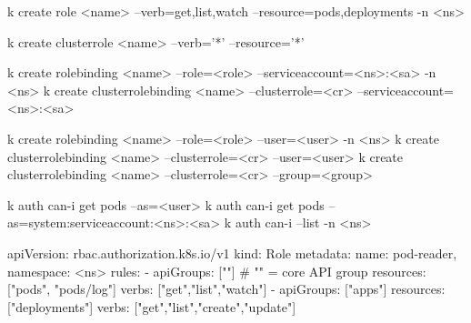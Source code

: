 \begin{tcbitemize}[
  raster columns=2, raster equal height=rows,
  blanker, cheat subtitle
]

  \tcbitem
    \begin{tcbitemize}[
      raster columns=1, raster equal height=rows,
      blanker, cheat subtitle
    ]

      \tcbitem

        \begin{cheatcodebash}
        k create role <name> --verb=get,list,watch --resource=pods,deployments -n <ns>
        \end{cheatcodebash}

        \begin{cheatcodebash}
        k create clusterrole <name> --verb='*' --resource='*'
        \end{cheatcodebash}

        \begin{cheatcodebash}
        k create rolebinding <name> --role=<role> --serviceaccount=<ns>:<sa> -n <ns>
        k create clusterrolebinding <name> --clusterrole=<cr> --serviceaccount=<ns>:<sa>
        \end{cheatcodebash}

        \begin{cheatcodebash}
        k create rolebinding <name> --role=<role> --user=<user> -n <ns>
        k create clusterrolebinding <name> --clusterrole=<cr> --user=<user>
        k create clusterrolebinding <name> --clusterrole=<cr> --group=<group>
        \end{cheatcodebash}

        \begin{cheatcodebash}
        k auth can-i get pods --as=<user>
        k auth can-i get pods --as=system:serviceaccount:<ns>:<sa>
        k auth can-i --list -n <ns>
        \end{cheatcodebash}

      \tcbitem

        \begin{cheatcodebash}
        apiVersion: rbac.authorization.k8s.io/v1
        kind: Role
        metadata: {name: pod-reader, namespace: <ns>}
        rules:
        - apiGroups: [""]           # "" = core API group
          resources: ["pods", "pods/log"]
          verbs: ["get","list","watch"]
        - apiGroups: ["apps"]
          resources: ["deployments"]
          verbs: ["get","list","create","update"]
        \end{cheatcodebash}


\end{tcbitemize}
\end{tcbitemize}
